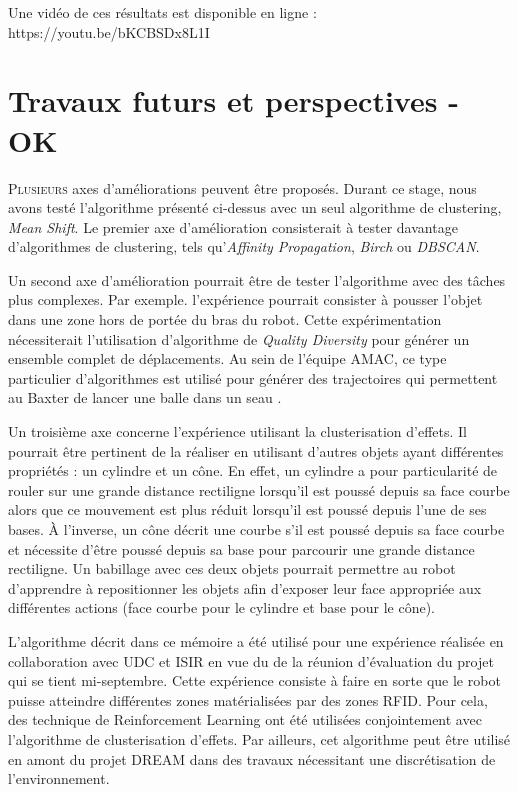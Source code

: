 \documentclass[draft]{llncs}
\begin{document}
Une vidéo de ces résultats est disponible en ligne : https://youtu.be/bKCBSDx8L1I





\section{Travaux futurs et perspectives - OK}

\lettrine{P}{lusieurs} axes d'améliorations peuvent être proposés.
Durant ce stage, nous avons testé l'algorithme présenté ci-dessus avec un seul algorithme de clustering, \textit{Mean Shift}.
Le premier axe d'amélioration consisterait à tester davantage d'algorithmes de clustering, tels qu'\textit{Affinity Propagation}, \textit{Birch} ou \textit{DBSCAN}.

Un second axe d'amélioration pourrait être de tester l'algorithme avec des tâches plus complexes.
Par exemple. l'expérience pourrait consister à pousser l'objet dans une zone hors de portée du bras du robot.
Cette expérimentation nécessiterait l'utilisation d'algorithme de \textit{Quality Diversity} \cite{Pugh2016} pour générer un ensemble complet de déplacements.
Au sein de l'équipe AMAC, ce type particulier d'algorithmes est utilisé pour générer des trajectoires qui permettent au Baxter de lancer une balle dans un seau \cite{Kim2017}. 

Un troisième axe concerne l'expérience utilisant la clusterisation d'effets.
Il pourrait être pertinent de la réaliser en utilisant d'autres objets ayant différentes propriétés : un cylindre et un cône.
En effet, un cylindre a pour particularité de rouler sur une grande distance rectiligne lorsqu'il est poussé depuis sa face courbe alors que ce mouvement est plus réduit lorsqu'il est poussé depuis l'une de ses bases.
À l'inverse, un cône décrit une courbe s'il est poussé depuis sa face courbe et nécessite d'être poussé depuis sa base pour parcourir une grande distance rectiligne. 
Un babillage avec ces deux objets pourrait permettre au robot d'apprendre à repositionner les objets afin d'exposer leur face appropriée aux différentes actions (face courbe pour le cylindre et base pour le cône).

L'algorithme décrit dans ce mémoire a été utilisé pour une expérience réalisée en collaboration avec UDC et ISIR en vue du de la réunion d'évaluation du projet qui se tient mi-septembre. 
Cette expérience consiste à faire en sorte que le robot puisse atteindre différentes zones matérialisées par des zones RFID.
Pour cela, des technique de Reinforcement Learning ont été utilisées conjointement avec l'algorithme de clusterisation d'effets.
Par ailleurs, cet algorithme peut être utilisé en amont du projet DREAM dans des travaux nécessitant une discrétisation de l'environnement.
\end{document}

